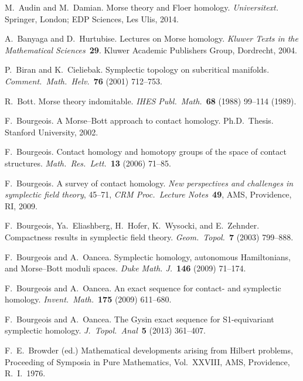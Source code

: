 \documentclass[12pt,twoside]{amsart}
\theoremstyle{plain}
\numberwithin{figure}{section}
\numberwithin{equation}{section}
\begin{document}
\begin{thebibliography}{999}
M.\ Audin and M.\  Damian. 
Morse theory and Floer homology. 
{\it Universitext.} Springer, London; EDP Sciences, Les Ulis, 2014.
   
A.\ Banyaga and D.\ Hurtubise.
Lectures on Morse homology. 
{\it Kluwer Texts in the Mathematical Sciences}~{\bf 29}. 
Kluwer Academic Publishers Group, Dordrecht, 2004.

P.\ Biran and K.\ Cieliebak.  
Symplectic topology on subcritical manifolds. 
{\it Comment.\ Math.\ Helv.}~{\bf 76} (2001) 712--753.

   
R.\ Bott.
Morse theory indomitable. 
{\it IHES Publ.\ Math.}~{\bf 68} (1988) 99--114 (1989).

F.\ Bourgeois.
A Morse--Bott approach to contact homology. 
Ph.D.\ Thesis. Stanford University, 2002.

F.\ Bourgeois.
Contact homology and homotopy groups of the space of contact structures. 
{\it Math.\ Res.\ Lett.}~{\bf 13} (2006) 71--85. 

F.\ Bourgeois. 
A survey of contact homology. 
{\it New perspectives and challenges in symplectic field theory}, 45--71, 
{\it CRM Proc.\ Lecture Notes}~{\bf 49}, AMS, Providence, RI, 2009.

F.\ Bourgeois, Ya.\ Eliashberg, H.\ Hofer, K.\ Wysocki, and E.\ Zehnder. 
Compactness results in symplectic field theory. 
{\it Geom.\ Topol.}~{\bf 7} (2003) 799--888.

F.\ Bourgeois and A.\ Oancea. 
Symplectic homology, autonomous Hamiltonians, and Morse--Bott moduli spaces. 
{\it Duke Math. J.}~{\bf 146} (2009) 71--174. 

F.\ Bourgeois and A.\ Oancea.
An exact sequence for contact- and symplectic homology. 
{\it Invent.\ Math.}~{\bf 175} (2009) 611--680.

F.\ Bourgeois and A.\ Oancea.
The Gysin exact sequence for S1-equivariant symplectic homology. 
{\it J.\ Topol.\ Anal}~{\bf 5} (2013) 361--407.

F.\ E.\ Browder (ed.)
Mathematical developments arising from Hilbert problems, 
Proceeding of Symposia in Pure Mathematics, Vol.\ XXVIII, 
AMS, Providence, R.\ I.\, 1976.


\end{thebibliography}
\end{document}
